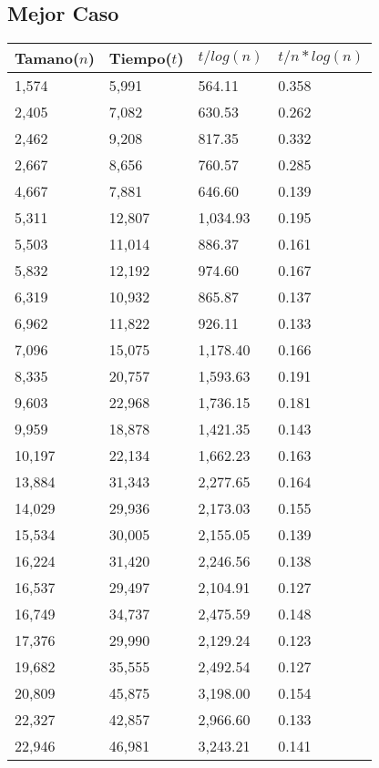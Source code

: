 \subsection{Mejor Caso}
\begin{table}[H]
\parbox{0.3\textwidth}{
  \begin{tabular}{| l | l | l |l |}
    \hline
    Tamano($n$) & Tiempo($t$) & $t / log(n)$ & $t / n*log(n)$ \\ \hline
1,574	&	5,991	&	564.11	&	0.358	\\ \hline
2,405	&	7,082	&	630.53	&	0.262	\\ \hline
2,462	&	9,208	&	817.35	&	0.332	\\ \hline
2,667	&	8,656	&	760.57	&	0.285	\\ \hline
4,667	&	7,881	&	646.60	&	0.139	\\ \hline
5,311	&	12,807	&	1,034.93	&	0.195	\\ \hline
5,503	&	11,014	&	886.37	&	0.161	\\ \hline
5,832	&	12,192	&	974.60	&	0.167	\\ \hline
6,319	&	10,932	&	865.87	&	0.137	\\ \hline
6,962	&	11,822	&	926.11	&	0.133	\\ \hline
7,096	&	15,075	&	1,178.40	&	0.166	\\ \hline
8,335	&	20,757	&	1,593.63	&	0.191	\\ \hline
9,603	&	22,968	&	1,736.15	&	0.181	\\ \hline
9,959	&	18,878	&	1,421.35	&	0.143	\\ \hline
10,197	&	22,134	&	1,662.23	&	0.163	\\ \hline
13,884	&	31,343	&	2,277.65	&	0.164	\\ \hline
14,029	&	29,936	&	2,173.03	&	0.155	\\ \hline
15,534	&	30,005	&	2,155.05	&	0.139	\\ \hline
16,224	&	31,420	&	2,246.56	&	0.138	\\ \hline
16,537	&	29,497	&	2,104.91	&	0.127	\\ \hline
16,749	&	34,737	&	2,475.59	&	0.148	\\ \hline
17,376	&	29,990	&	2,129.24	&	0.123	\\ \hline
19,682	&	35,555	&	2,492.54	&	0.127	\\ \hline
20,809	&	45,875	&	3,198.00	&	0.154	\\ \hline
22,327	&	42,857	&	2,966.60	&	0.133	\\ \hline
22,946	&	46,981	&	3,243.21	&	0.141	\\ \hline

\end{tabular}}
\end{table}
